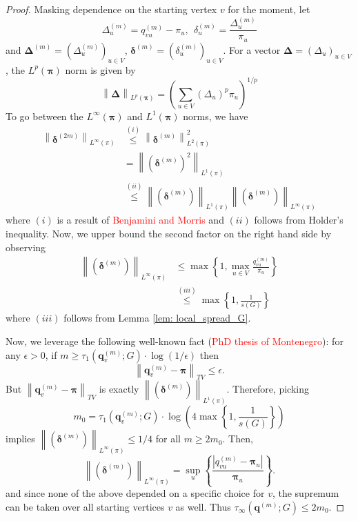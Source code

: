 \documentclass{article}
\newcommand{\abs}[1]{\left \lvert #1 \right \rvert}
\newcommand{\norm}[1]{\left\lVert#1\right\rVert}
\newcommand{\1}{\mathbf{1}}
\newcommand{\qbf}{\mathbf{q}}
\newcommand{\pibf}{\bm{\pi}}
\newcommand{\Deltabf}{\bm{\Delta}}
\newcommand{\deltabf}{\bm{\delta}}
\theoremstyle{aldenthm}
\begin{document}
\begin{proof}
	Masking dependence on the starting vertex $v$ for the moment, let
	\begin{equation*}
	\Delta_u^{(m)} = q_{vu}^{(m)} - \pi_u, ~~ \delta_u^{(m)} = \frac{\Delta_u^{(m)}}{\pi_u}
	\end{equation*}
	and $\Deltabf^{(m)} = (\Delta_u^{(m)})_{u \in V}$, $\deltabf^{(m)} = (\delta_u^{(m)})_{u \in V}$. For a vector $\Deltabf = (\Delta_u)_{u \in V}$, the $L^{p}(\pibf)$ norm is given by
	\begin{equation*}
	\norm{\Deltabf}_{L^p(\pibf)} = \left(\sum_{u \in V} \left(\Delta_u\right)^{p} \pi_u \right)^{1/p}
	\end{equation*}
	To go between the $L^{\infty}(\pibf)$ and $L^{1}(\pibf)$ norms, we have
	\begin{align*}
	\norm{\deltabf^{(2m)}}_{L^{\infty}(\pi)} & \overset{(i)}{\leq} \norm{\deltabf^{(m)}}^2_{L^{2}(\pi)} \\
	& = \norm{(\deltabf^{(m)})^2}_{L^{1}(\pi)} \\
	& \overset{(ii)}{\leq}  \norm{(\deltabf^{(m)})}_{L^{1}(\pi)} \norm{(\deltabf^{(m)})}_{L^{\infty}(\pi)}
	\end{align*}
	where $(i)$ is a result of \textcolor{red}{Benjamini and Morris} and $(ii)$ follows from Holder's inequality. Now, we upper bound the second factor on the right hand side by observing
	\begin{align*}
	\norm{(\deltabf^{(m)})}_{L^{\infty}(\pi)} & \leq \max\left\{1, \max_{u \in V} \frac{q_{vu}^{(m)}}{\pi_u} \right\} \\
	& \overset{(iii)}{\leq} \max\left\{1, \frac{1}{s(G)}\right\}
	\end{align*}
	where $(iii)$ follows from Lemma \ref{lem: local_spread_G}.
	
	Now, we leverage the following well-known fact (\textcolor{red}{PhD thesis of Montenegro}): for any $\epsilon > 0$, if $m \geq \tau_1(\qbf_v^{(m)}; G) \cdot \log(1/\epsilon)$ then
	\begin{equation*}
	\norm{\qbf_v^{(m)} - \pibf}_{TV} \leq \epsilon.
	\end{equation*}
	But $\norm{\qbf_v^{(m)} - \pibf}_{TV}$ is exactly $\norm{(\deltabf^{(m)})}_{L^{1}(\pi)}$. Therefore, picking 
	\begin{equation*}
	m_0 = \tau_1(\qbf_v^{(m)}; G) \cdot \log \left(4 \max\left\{1, \frac{1}{s(G)}\right\} \right)
	\end{equation*} implies $\norm{(\deltabf^{(m)})}_{L^{\infty}(\pi)} \leq 1/4$ for all $m \geq 2 m_0$.  Then, 
	\begin{equation*}
	\norm{(\deltabf^{(m)})}_{L^{\infty}(\pi)} = \sup_{u}\left\{ \frac{\abs{q_{vu}^{(m)} - \pibf_u}}{\pibf_u} \right\}.
	\end{equation*}
	and since none of the above depended on a specific choice for $v$, the supremum can be taken over all starting vertices $v$ as well. Thus $\tau_{\infty}(\qbf^{(m)}; G) \leq 2m_0$. 
	

\end{proof}
\end{document}
